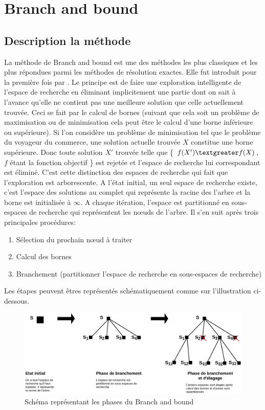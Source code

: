 \documentclass[12pt,a4paper,oneside]{book}
\theoremstyle{definition}
\begin{document}
	\section{Branch and bound} \label{bb}
	\subsection{Description la méthode}
	La méthode de Branch and bound est une des méthodes les plus classiques et les plus répondues parmi les méthodes de résolution exactes. Elle fut introduit pour la première fois par \cite{Land1960}. Le principe est de faire une exploration intelligente de l'espace de recherche en éliminant implicitement une partie dont on sait à l'avance qu'elle ne contient pas une meilleure solution que celle actuellement trouvée. Ceci se fait par le calcul de bornes (suivant que cela soit un problème de maximisation ou de minimisation cela peut être le calcul d'une borne inférieure ou supérieure). Si l'on considère un problème de minimisation tel que le problème du voyageur du commerce, une solution actuelle trouvée $X$ constitue une borne supérieure. Donc toute solution $X'$ trouvée telle que \{ $f(X') \textgreater f(X)$, $f$ étant la fonction objectif \} est rejetée et l'espace de recherche lui correspondant est éliminé. C'est cette distinction des espaces de recherche qui fait que l'exploration est arborescente. A l'état initial, un seul espace de recherche existe, c'est l'espace des solutions au complet qui représente la racine des l'arbre et la borne est initialisée à $\infty$. A chaque itération, l'espace est partitionné en sous-espaces de recherche qui représentent les nœuds de l'arbre. Il s'en suit après trois principales procédures:
	\begin{enumerate}
		\item Sélection du prochain nœud à traiter
		\item Calcul des bornes
		\item Branchement (partitionner l'espace de recherche en sous-espaces de recherche)
	\end{enumerate} 
	Les étapes peuvent êtres représentés schématiquement comme sur l'illustration ci-dessous.
	\begin{figure}[H]
		\centering
		\includegraphics[width=0.9\linewidth]{schema_b&b}
		\caption{Schéma représentant les phases du Branch and bound}
		\label{fig:schemabb}
	\end{figure}
	
\end{document}
